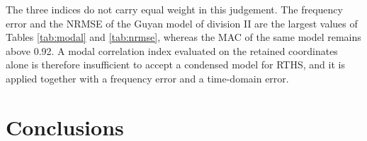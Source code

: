 \documentclass[a4paper,fleqn,review,12pt]{cas-sc}
\numberwithin{equation}{section}
\begin{document}
The three indices do not carry equal weight in this judgement. The frequency error and the NRMSE of the Guyan model of division II are the largest values of Tables \ref{tab:modal} and \ref{tab:nrmse}, whereas the MAC of the same model remains above 0.92. A modal correlation index evaluated on the retained coordinates alone is therefore insufficient to accept a condensed model for RTHS, and it is applied together with a frequency error and a time-domain error.




\section{Conclusions} \label{sec6}



\nocite{ChenRicles2008a,Li2021}


\end{document}
